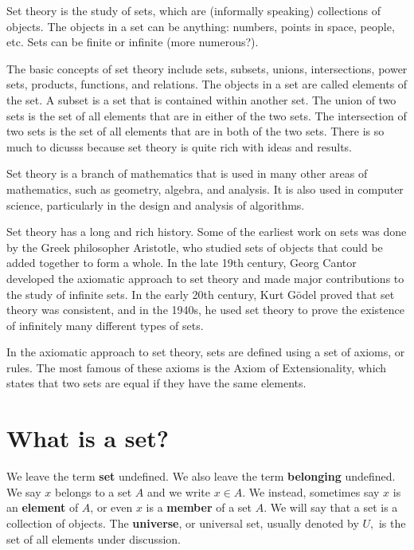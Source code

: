 \documentclass[
  letterpaper,
  10pt,
  reqno,
  twopage,
  openany]{book}
\theoremstyle{plain}
\theoremstyle{definition}
\theoremstyle{definition}
\theoremstyle{definition}
\theoremstyle{plain}
\theoremstyle{plain}
\theoremstyle{remark}
\begin{document}
Set theory is the study of sets, which are (informally speaking)
collections of objects. The objects in a set can be anything: numbers,
points in space, people, etc. Sets can be finite or infinite (more
numerous?).

The basic concepts of set theory include sets, subsets, unions,
intersections, power sets, products, functions, and relations. The
objects in a set are called elements of the set. A subset is a set that
is contained within another set. The union of two sets is the set of all
elements that are in either of the two sets. The intersection of two
sets is the set of all elements that are in both of the two sets. There
is so much to dicusss because set theory is quite rich with ideas and
results.

Set theory is a branch of mathematics that is used in many other areas
of mathematics, such as geometry, algebra, and analysis. It is also used
in computer science, particularly in the design and analysis of
algorithms.

Set theory has a long and rich history. Some of the earliest work on
sets was done by the Greek philosopher Aristotle, who studied sets of
objects that could be added together to form a whole. In the late 19th
century, Georg Cantor developed the axiomatic approach to set theory and
made major contributions to the study of infinite sets. In the early
20th century, Kurt Gödel proved that set theory was consistent, and in
the 1940s, he used set theory to prove the existence of infinitely many
different types of sets.

In the axiomatic approach to set theory, sets are defined using a set of
axioms, or rules. The most famous of these axioms is the Axiom of
Extensionality, which states that two sets are equal if they have the
same elements.

\hypertarget{what-is-a-set}{%
\section{What is a set?}\label{what-is-a-set}}

We leave the term  \textbf{set} undefined. We also leave the
term  \textbf{belonging} undefined. We say \(x\)
belongs to a set \(A\) and we write \(x\in A\). We instead, sometimes
say \(x\) is an  \textbf{element} of \(A\), or even \(x\)
is a  \textbf{member} of a set \(A\). We will say that a
set is a collection of objects. The  \textbf{universe},
or universal set, usually denoted by \(U,\) is the set of all elements
under discussion.
\end{document}
